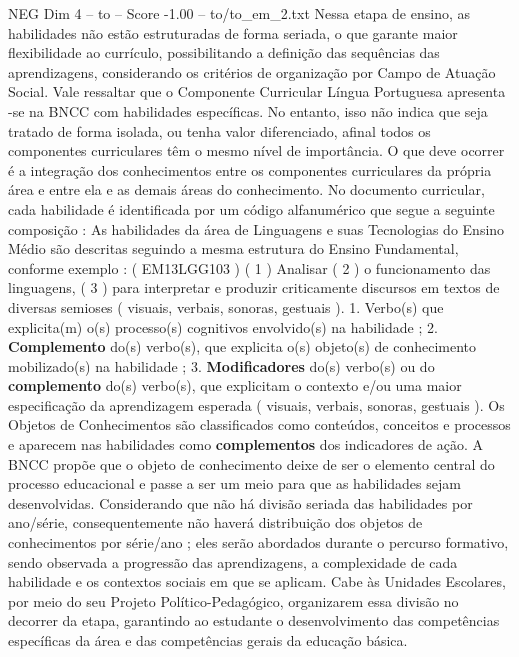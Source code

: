 \begin{textsample}{NEG Dim 4 – to – Score -1.00 – to/to\_em\_2.txt}
Nessa etapa de ensino, as habilidades não estão estruturadas de forma seriada, o que garante maior flexibilidade ao currículo, possibilitando a definição das sequências das aprendizagens, considerando os critérios de organização por Campo de Atuação Social.
Vale ressaltar que o Componente Curricular Língua Portuguesa apresenta -se na BNCC com habilidades específicas.
No entanto, isso não indica que seja tratado de forma isolada, ou tenha valor diferenciado, afinal todos os componentes curriculares têm o mesmo nível de importância.
O que deve ocorrer é a integração dos conhecimentos entre os componentes curriculares da própria área e entre ela e as demais áreas do conhecimento.
No documento curricular, cada habilidade é identificada por um código alfanumérico que segue a seguinte composição : As habilidades da área de Linguagens e suas Tecnologias do Ensino Médio são descritas seguindo a mesma estrutura do Ensino Fundamental, conforme exemplo : ( EM13LGG103 ) ( 1 ) Analisar ( 2 ) o funcionamento das linguagens, ( 3 ) para interpretar e produzir criticamente discursos em textos de diversas semioses ( visuais, verbais, sonoras, gestuais ). 1.
Verbo(s) que explicita(m) o(s) processo(s) cognitivos envolvido(s) na habilidade ; 2. \textbf{Complemento} do(s) verbo(s), que explicita o(s) objeto(s) de conhecimento mobilizado(s) na habilidade ; 3. \textbf{Modificadores} do(s) verbo(s) ou do \textbf{complemento} do(s) verbo(s), que explicitam o contexto e/ou uma maior especificação da aprendizagem esperada ( visuais, verbais, sonoras, gestuais ).
Os Objetos de Conhecimentos são classificados como conteúdos, conceitos e processos e aparecem nas habilidades como \textbf{complementos} dos indicadores de ação.
A BNCC propõe que o objeto de conhecimento deixe de ser o elemento central do processo educacional e passe a ser um meio para que as habilidades sejam desenvolvidas.
Considerando que não há divisão seriada das habilidades por ano/série, consequentemente não haverá distribuição dos objetos de conhecimentos por série/ano ; eles serão abordados durante o percurso formativo, sendo observada a progressão das aprendizagens, a complexidade de cada habilidade e os contextos sociais em que se aplicam.
Cabe às Unidades Escolares, por meio do seu Projeto Político-Pedagógico, organizarem essa divisão no decorrer da etapa, garantindo ao estudante o desenvolvimento das competências específicas da área e das competências gerais da educação básica.

\end{textsample}
